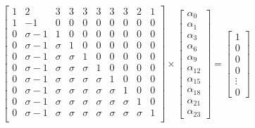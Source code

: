 \begin{equation}
{
\left[ \begin{array}{cccccccccc}
1 & 2 & 3 & 3 & 3 & 3 & 3 & 3 & 2 & 1\\
1 & -1 & 0 & 0 & 0 & 0 & 0 & 0 & 0 & 0\\
0 & \sigma-1 & 1 & 0 & 0 & 0 & 0 & 0 & 0 & 0 \\
0 & \sigma-1 & \sigma & 1 & 0 & 0 & 0 & 0 & 0 & 0 \\
0 & \sigma-1 & \sigma & \sigma & 1 & 0 & 0 & 0 & 0 & 0\\
0 & \sigma-1 & \sigma & \sigma & \sigma & 1 & 0 & 0 & 0 & 0\\
0 & \sigma-1 & \sigma & \sigma & \sigma & \sigma & 1 & 0 & 0 & 0\\
0 & \sigma-1 & \sigma & \sigma & \sigma & \sigma & \sigma & 1 & 0 & 0\\
0 & \sigma-1 & \sigma & \sigma & \sigma & \sigma & \sigma & \sigma & 1 & 0\\
0 & \sigma-1 & \sigma & \sigma & \sigma & \sigma & \sigma & \sigma & \sigma & 1 \\
\end{array} 
\right ]} \times \left[ \begin{array}{c}
\alpha_{0} \\
\alpha_{1} \\
\alpha_{3} \\
\alpha_{6} \\
\alpha_{9} \\
\alpha_{12}\\
\alpha_{15}\\
\alpha_{18}\\
\alpha_{21}\\
\alpha_{23}
\end{array} 
\right ] = \left[ \begin{array}{c}
1 \\
0 \\
0 \\
0 \\
\vdots \\
0
\end{array} 
\right ]
\end{equation}
